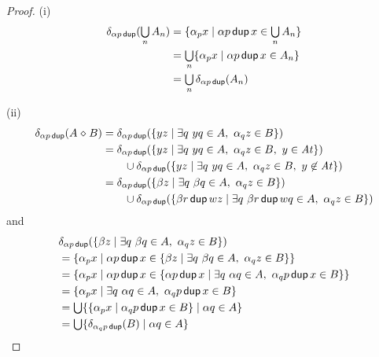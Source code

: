\documentclass{article}
\newcommand\At{\ensuremath{\mathit{At}}}
\renewcommand\smash{\mathrel{\diamond}}
\newcommand\pdup{\mathop{\mathsf{dup}}}
\newcommand\sbigcup{\mathop{\textstyle\bigcup}}
\begin{document}
\begin{proof}
(i)
\begin{align*}
\delta_{\alpha p\pdup}(\sbigcup_n A_n)
&= \set{\alpha_p x}{\alpha p\pdup x\in\sbigcup_n A_n}\\
&= \sbigcup_n \set{\alpha_p x}{\alpha p\pdup x\in A_n}\\
&= \sbigcup_n \delta_{\alpha p\pdup}(A_n)
\end{align*}

(ii)
\begin{align*}
\delta_{\alpha p\pdup}(A\smash B)
&= \delta_{\alpha p\pdup}(\set{yz}{\exists q\ yq\in A,\ \alpha_qz\in B})\\
&= \delta_{\alpha p\pdup}(\set{yz}{\exists q\ yq\in A,\ \alpha_qz\in B,\ y\in\At})\\
&\qquad \cup\delta_{\alpha p\pdup}(\set{yz}{\exists q\ yq\in A,\ \alpha_qz\in B,\ y\not\in\At})\\
&= \delta_{\alpha p\pdup}(\set{\beta z}{\exists q\ \beta q\in A,\ \alpha_qz\in B})\\
&\qquad \cup\delta_{\alpha p\pdup}(\set{\beta r\pdup wz}{\exists q\ \beta r\pdup wq\in A,\ \alpha_qz\in B})
\end{align*}
and
\begin{align*}
& \delta_{\alpha p\pdup}(\set{\beta z}{\exists q\ \beta q\in A,\ \alpha_qz\in B})\\
&= \set{\alpha_p x}{\alpha p\pdup x\in\set{\beta z}{\exists q\ \beta q\in A,\ \alpha_qz\in B}}\\
&= \set{\alpha_p x}{\alpha p\pdup x\in\set{\alpha p\pdup x}{\exists q\ \alpha q\in A,\ \alpha_qp\pdup x\in B}}\\
&= \set{\alpha_p x}{\exists q\ \alpha q\in A,\ \alpha_qp\pdup x\in B}\\
&= \sbigcup \set{\set{\alpha_p x}{\alpha_q p\pdup x\in B}}{\alpha q\in A}\\
&= \sbigcup \set{\delta_{\alpha_q p\pdup}(B)}{\alpha q\in A}
\end{align*}


\end{proof}
\end{document}
